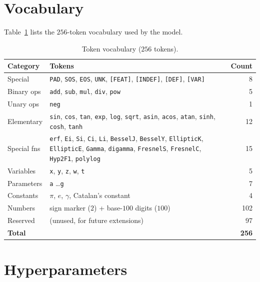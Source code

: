 \documentclass{article}
\begin{document}
\newpage
\appendix

\section{Vocabulary}
\label{app:vocab}

Table~\ref{tab:vocab} lists the $256$-token vocabulary used by the model.

\begin{table}[h]
	\centering
	\caption{Token vocabulary ($256$ tokens).}
	\label{tab:vocab}
	\footnotesize
	\begin{tabular}{lp{7.5cm}r}
		\toprule
		Category    & Tokens & Count \\
		\midrule
		Special     & \texttt{PAD}, \texttt{SOS}, \texttt{EOS}, \texttt{UNK}, \texttt{[FEAT]}, \texttt{[INDEF]}, \texttt{[DEF]}, \texttt{[VAR]} & 8 \\
		Binary ops  & \texttt{add}, \texttt{sub}, \texttt{mul}, \texttt{div}, \texttt{pow} & 5 \\
		Unary ops   & \texttt{neg} & 1 \\
		Elementary  & \texttt{sin}, \texttt{cos}, \texttt{tan}, \texttt{exp}, \texttt{log}, \texttt{sqrt}, \texttt{asin}, \texttt{acos}, \texttt{atan}, \texttt{sinh}, \texttt{cosh}, \texttt{tanh} & 12 \\
		Special fns & \texttt{erf}, \texttt{Ei}, \texttt{Si}, \texttt{Ci}, \texttt{Li}, \texttt{BesselJ}, \texttt{BesselY}, \texttt{EllipticK}, \texttt{EllipticE}, \texttt{Gamma}, \texttt{digamma}, \texttt{FresnelS}, \texttt{FresnelC}, \texttt{Hyp2F1}, \texttt{polylog} & 15 \\
		Variables   & \texttt{x}, \texttt{y}, \texttt{z}, \texttt{w}, \texttt{t} & 5 \\
		Parameters  & \texttt{a} \ldots \texttt{g} & 7 \\
		Constants   & $\pi$, $e$, $\gamma$, Catalan's constant & 4 \\
		Numbers     & sign marker ($2$) + base-$100$ digits ($100$) & 102 \\
		Reserved    & (unused, for future extensions) & 97 \\
		\midrule
		\textbf{Total} & & \textbf{256} \\
		\bottomrule
	\end{tabular}
\end{table}


\section{Hyperparameters}
\label{app:hyperparams}
\end{document}
